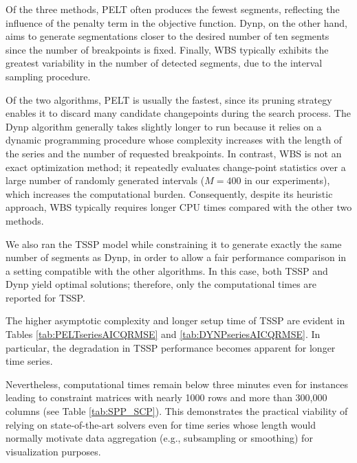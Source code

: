 \documentclass[preprints,article,submit,pdftex,moreauthors]{Definitions/mdpi}
\begin{document}
Of the three methods, PELT often produces the fewest segments, reflecting the influence of the penalty term in the objective function. 
Dynp, on the other hand, aims to generate segmentations closer to the desired number of ten segments since the number of breakpoints is fixed. Finally, WBS typically exhibits the greatest variability in the number of detected segments, due to the interval sampling procedure. 

Of the two algorithms, PELT is usually the fastest, since its pruning strategy enables it to discard many candidate changepoints during the search process.
The Dynp algorithm generally takes slightly longer to run because it relies on a dynamic programming procedure whose complexity increases with the length of the series and the number of requested breakpoints. 
In contrast, WBS is not an exact optimization method; it repeatedly evaluates change-point statistics over a large number of randomly generated intervals ($M = 400$ in our experiments), which increases the computational burden. 
Consequently, despite its heuristic approach, WBS typically requires longer CPU times compared with the other two methods.

We also ran the TSSP model while constraining it to generate exactly the same number of segments as Dynp, in order to allow a fair performance comparison in a setting compatible with the other algorithms. In this case, both TSSP and Dynp yield optimal solutions; therefore, only the computational times are reported for TSSP.

The higher asymptotic complexity and longer setup time of TSSP are evident in Tables \ref{tab:PELTseriesAICQRMSE} and \ref{tab:DYNPseriesAICQRMSE}. In particular, the degradation in TSSP performance becomes apparent for longer time series.

Nevertheless, computational times remain below three minutes even for instances leading to constraint matrices with nearly 1000 rows and more than 300,000 columns (see Table \ref{tab:SPP_SCP}). This demonstrates the practical viability of relying on state-of-the-art solvers even for time series whose length would normally motivate data aggregation (e.g., subsampling or smoothing) for visualization purposes.
\end{document}
